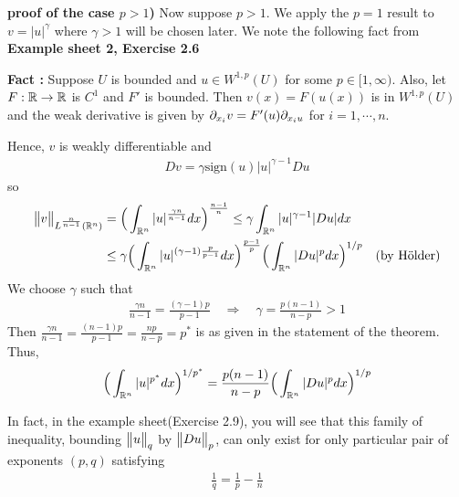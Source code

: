 \documentclass[12pt,a4paper]{report}
\newenvironment{proof}
{\begin{changemargin}{1cm}{0.5cm} 
	}%
	{\end{changemargin}
}
\newenvironment{subproof}
{\begin{changemargin}{0.5cm}{0.5cm} 
	}%
	{\end{changemargin}
}
\begin{document}
\begin{proof}
\textbf{proof of the case $p>1$) } Now suppose $p>1$. We apply the $p=1$ result to $v= |u|^{\gamma}$ where $\gamma >1$ will be chosen later. We note the following fact from \textbf{Example sheet 2, Exercise 2.6}
\begin{subproof}
\textbf{Fact :} Suppose $U$ is bounded and $u\in W^{1,p}(U)$ for some $p\in [1,\infty)$. Also, let $F: \mathbb{R} \rightarrow \mathbb{R}$ is $C^1$ and $F'$ is bounded. Then $v(x)=F(u(x))$ is in $W^{1,p}(U)$ and the weak derivative is given by $\partial_{x_i} v = F'(u) \partial_{x_i u}$ for $i=1,\cdots,n$.
\end{subproof}
Hence, $v$ is weakly differentiable and 
\begin{align*}
Dv = \gamma \text{sign}(u) |u|^{\gamma -1} Du
\end{align*}
so
\begin{align*}
\bigl\lVert v\bigr\rVert_{L^{\frac{n}{n-1}}(\mathbb{R}^n)} &= \Big( \int_{\mathbb{R}^n} |u|^{\frac{\gamma n}{n-1}}  dx \Big)^{\frac{n-1}{n}} \leq \gamma \int_{\mathbb{R}^n} |u|^{\gamma -1} |Du| dx \\
&\leq \gamma \Big( \int_{\mathbb{R}^n} |u|^{(\gamma-1) \frac{p}{p-1}} dx \Big)^{\frac{p-1}{p}} \Big( \int_{\mathbb{R}^n} |Du|^p dx \Big)^{1/p} \quad \text{(by H\"{o}lder)}
\end{align*}
We choose $\gamma$ such that
\begin{align*}
\frac{\gamma n}{n-1} = \frac{(\gamma -1)p}{p-1} \quad \Rightarrow \quad \gamma = \frac{p(n-1)}{n-p} >1
\end{align*}
Then $\frac{\gamma n}{n-1} = \frac{(n-1)p}{p-1} = \frac{np}{n-p} = p^*$ is as given in the statement of the theorem. Thus,
\begin{align*}
\Big( \int_{\mathbb{R}^n} |u|^{p^*} dx \Big)^{1/p^*} = \frac{p(n-1)}{n-p} \Big( \int_{\mathbb{R}^n} |Du|^p dx \Big)^{1/p}
\end{align*}

\eop
\end{proof}
\s

In fact, in the example sheet(Exercise 2.9), you will see that this family of inequality, bounding $\bigl\lVert u\bigr\rVert_{q}$ by $\bigl\lVert Du\bigr\rVert_{p}$, can only exist for only particular pair of exponents $(p,q)$ satisfying
\begin{align*}
\frac{1}{q} = \frac{1}{p} - \frac{1}{n}
\end{align*}
\s
\end{document}
